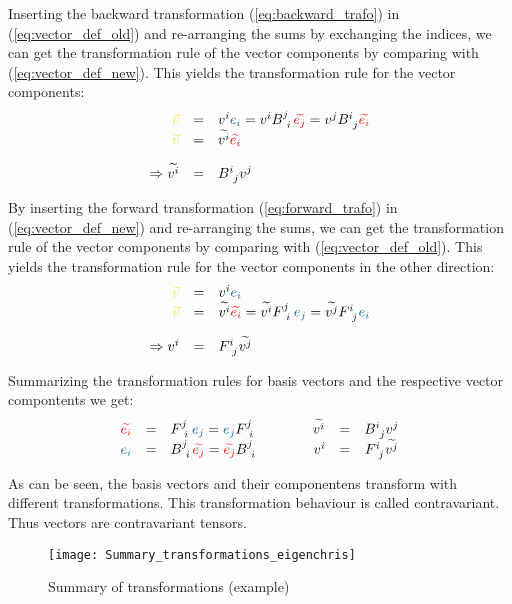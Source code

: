 Inserting the backward transformation (\ref{eq:backward_trafo}) in
(\ref{eq:vector_def_old}) and re-arranging the sums by exchanging the indices, we can get
the transformation rule of the vector components by comparing with
(\ref{eq:vector_def_new}). This yields the transformation rule for the vector components:
\begin{equation}
  \label{eq:vector_trafo_to_new}
  \begin{array}{rcl}
    \hdv & = & \hdvc{i} \hdbvc{i}
    = \hdvc{i} B^{j~}_{~i} \hdbtvc{j}
    = \hdvc{j} B^{i~}_{~j} \hdbtvc{i} \\
    \hdv & = & \hdtvc{i} \hdbtvc{i}
    \\ \noalign{\vskip10pt}
    \Rightarrow \hdtvc{i} & = & B^{i~}_{~j} \hdvc{j}
  \end{array}
\end{equation}

By inserting the forward transformation (\ref{eq:forward_trafo}) in
(\ref{eq:vector_def_new}) and re-arranging the sums, we can get the transformation rule of
the vector components by comparing with (\ref{eq:vector_def_old}). This yields the
transformation rule for the vector components in the other direction:
\begin{equation}
  \label{eq:vector_trafo_to_old}
  \begin{array}{rcl}
    \hdv & = & \hdvc{i} \hdbvc{i} \\
    \hdv & = & \hdtvc{i} \hdbtvc{i}
    = \hdtvc{i} F^{j~}_{~i}\hdbvc{j}
    = \hdtvc{j} F^{i~}_{~j}\hdbvc{i}\\
    \noalign{\vskip10pt}
    \Rightarrow \hdvc{i} & = &  F^{i~}_{~j} \hdtvc{j}
  \end{array}
\end{equation}

Summarizing the transformation rules for basis vectors and the respective vector
compontents we get:
\begin{equation}
  \label{eq:vector_trafo_overview}
  \begin{array}{rclrcl}
    \hdbtvc{i} & = &
    F^{j~}_{~i}\hdbvc{j} = \hdbvc{j} F^{j~}_{~i} \qquad\qquad
    \hdtvc{i} & = & B^{i~}_{~j} \hdvc{j} \\
    \hdbvc{i} & = &
    B^{j~}_{~i}\hdbtvc{j} = \hdbtvc{j} B^{j~}_{~i} \qquad\qquad
    \hdvc{i} & = &  F^{i~}_{~j} \hdtvc{j}
  \end{array}
\end{equation}

As can be seen, the basis vectors and their componentens transform with different
transformations. This transformation behaviour is called contravariant. Thus vectors are
contravariant tensors. \\
\begin{figure}[h]
  \centering
  \texttt{[image: Summary\_transformations\_eigenchris]}
  \caption{Summary of transformations (example)}
  \label{fig:transformation_summary_example}
\end{figure}

